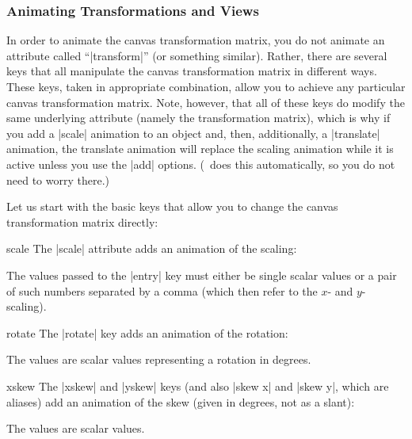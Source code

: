 \subsubsection{Animating Transformations  and Views}
\label{section-base-animation-views}


In order to animate the canvas transformation matrix, you do not
animate an attribute called ``|transform|'' (or something
similar). Rather, there are several keys that all manipulate the
canvas transformation matrix in different ways. These keys, taken in
appropriate combination, allow you to achieve any particular canvas
transformation matrix. Note, however, that all of these keys do modify
the same underlying attribute (namely the transformation matrix),
which is why if you add a |scale| animation to an object and, then,
additionally, a |translate| animation, the translate animation will
replace the scaling animation while it is active unless you use the
|add| options. (\tikzname\ does this automatically, so you do not need
to worry there.)

Let us start with the basic keys that allow you to change the
canvas transformation matrix directly:

\begin{animateattribute}{scale}
  The |scale| attribute adds an animation of the scaling:
\begin{codeexample}[width=2.3cm]
\end{codeexample}
  The values passed to the |entry| key must either be single scalar
  values or a pair of such numbers separated by a comma (which then
  refer to the $x$- and $y$-scaling).
\end{animateattribute}

\begin{animateattribute}{rotate}
  The |rotate| key adds an animation of the rotation:
\begin{codeexample}[width=2.3cm]
\end{codeexample}
  The values are scalar values representing a rotation in degrees.
\end{animateattribute}


\begin{animateattribute}{xskew}
  The |xskew| and |yskew| keys (and also |skew x| and |skew y|,
  which are aliases) add an animation of the skew (given
  in degrees, not as a slant):
\begin{codeexample}[width=2.3cm]
\end{codeexample}
  The values are scalar values.
\end{animateattribute}

